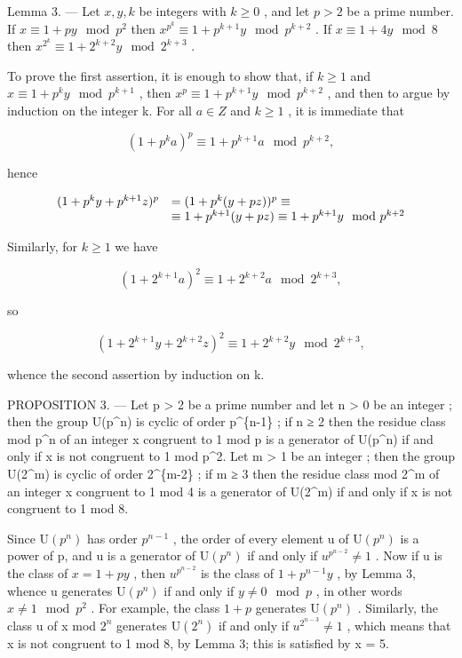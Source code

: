 Lemma 3. --- Let \(x, y, k\) be integers with \(k \geqslant 0\) , and let \(p > 2\) be a prime number. If \(x \equiv 1 + py \mod p^2\) then \(x^{p^k} \equiv 1 + p^{k+1}y \mod p^{k+2}\) . If \(x \equiv 1 + 4y \mod 8\) then \(x^{2^k} \equiv 1 + 2^{k+2}y \mod 2^{k+3}\) .

To prove the first assertion, it is enough to show that, if \(k \geqslant 1\) and \(x \equiv 1 + p^{k}y \mod p^{k+1}\) , then \(x^{p} \equiv 1 + p^{k+1}y \mod p^{k+2}\) , and then to argue by induction on the integer k. For all \(a \in Z\) and \(k \geqslant 1\) , it is immediate that

\[
(1 + p ^ {k} a) ^ {p} \equiv 1 + p ^ {k + 1} a \mod p ^ {k + 2},
\]

hence

\[
\begin{array}{r l} (1 + p ^ {k} y + p ^ {k + 1} z) ^ {p} & = (1 + p ^ {k} (y + p z)) ^ {p} \equiv \\ & \equiv 1 + p ^ {k + 1} (y + p z) \equiv 1 + p ^ {k + 1} y \mod p ^ {k + 2} \end{array}
\]

Similarly, for \(k \geqslant 1\) we have

\[
(1 + 2 ^ {k + 1} a) ^ {2} \equiv 1 + 2 ^ {k + 2} a \mod 2 ^ {k + 3},
\]

so

\[
(1 + 2 ^ {k + 1} y + 2 ^ {k + 2} z) ^ {2} \equiv 1 + 2 ^ {k + 2} y \mod 2 ^ {k + 3},
\]

whence the second assertion by induction on k.

PROPOSITION 3. --- Let p \textgreater{} 2 be a prime number and let n \textgreater{} 0 be an integer ; then the group U(p\^{}n) is cyclic of order p\^{}\{n-1\} ; if n ≥ 2 then the residue class mod p\^{}n of an integer x congruent to 1 mod p is a generator of U(p\^{}n) if and only if x is not congruent to 1 mod p\^{}2. Let m \textgreater{} 1 be an integer ; then the group U(2\^{}m) is cyclic of order 2\^{}\{m-2\} ; if m ≥ 3 then the residue class mod 2\^{}m of an integer x congruent to 1 mod 4 is a generator of U(2\^{}m) if and only if x is not congruent to 1 mod 8.

Since \(\mathrm{U}(p^{n})\) has order \(p^{n-1}\) , the order of every element u of \(\mathrm{U}(p^{n})\) is a power of p, and u is a generator of \(\mathrm{U}(p^{n})\) if and only if \(u^{p^{n-2}} \neq 1\) . Now if u is the class of \(x = 1 + py\) , then \(u^{p^{n-2}}\) is the class of \(1 + p^{n-1}y\) , by Lemma 3, whence u generates \(\mathrm{U}(p^{n})\) if and only if \(y \neq 0 \mod p\) , in other words \(x \neq 1 \mod p^{2}\) . For example, the class \(1 + p\) generates \(\mathrm{U}(p^{n})\) . Similarly, the class u of x mod \(2^{n}\) generates \(\mathrm{U}(2^{n})\) if and only if \(u^{2^{n-3}} \neq 1\) , which means that x is not congruent to 1 mod 8, by Lemma 3; this is satisfied by x = 5.

